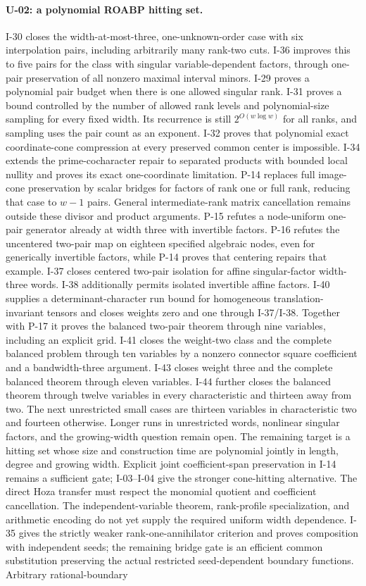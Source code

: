 \paragraph{U-02: a polynomial ROABP hitting set.}
I-30 closes the width-at-most-three, one-unknown-order case with six interpolation pairs, including arbitrarily many rank-two cuts. I-36 improves this to five pairs for the class with singular variable-dependent factors, through one-pair preservation of all nonzero maximal interval minors. I-29 proves a polynomial pair budget when there is one allowed singular rank. I-31 proves a bound controlled by the number of allowed rank levels and polynomial-size sampling for every fixed width. Its recurrence is still $2^{O(w\log w)}$ for all ranks, and sampling uses the pair count as an exponent. I-32 proves that polynomial exact coordinate-cone compression at every preserved common center is impossible. I-34 extends the prime-cocharacter repair to separated products with bounded local nullity and proves its exact one-coordinate limitation. P-14 replaces full image-cone preservation by scalar bridges for factors of rank one or full rank, reducing that case to $w-1$ pairs. General intermediate-rank matrix cancellation remains outside these divisor and product arguments. P-15 refutes a node-uniform one-pair generator already at width three with invertible factors. P-16 refutes the uncentered two-pair map on eighteen specified algebraic nodes, even for generically invertible factors, while P-14 proves that centering repairs that example. I-37 closes centered two-pair isolation for affine singular-factor width-three words. I-38 additionally permits isolated invertible affine factors. I-40 supplies a determinant-character run bound for homogeneous translation-invariant tensors and closes weights zero and one through I-37/I-38. Together with P-17 it proves the balanced two-pair theorem through nine variables, including an explicit grid. I-41 closes the weight-two class and the complete balanced problem through ten variables by a nonzero connector square coefficient and a bandwidth-three argument. I-43 closes weight three and the complete balanced theorem through eleven variables. I-44 further closes the balanced theorem through twelve variables in every characteristic and thirteen away from two. The next unrestricted small cases are thirteen variables in characteristic two and fourteen otherwise. Longer runs in unrestricted words, nonlinear singular factors, and the growing-width question remain open. The remaining target is a hitting set whose size and construction time are polynomial jointly in length, degree and growing width. Explicit joint coefficient-span preservation in I-14 remains a sufficient gate; I-03--I-04 give the stronger cone-hitting alternative. The direct Hoza transfer must respect the monomial quotient and coefficient cancellation. The independent-variable theorem, rank-profile specialization, and arithmetic encoding do not yet supply the required uniform width dependence. I-35 gives the strictly weaker rank-one-annihilator criterion and proves composition with independent seeds; the remaining bridge gate is an efficient common substitution preserving the actual restricted seed-dependent boundary functions. Arbitrary rational-boundary 